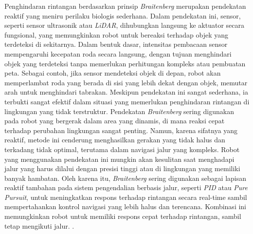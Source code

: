 Penghindaran rintangan berdasarkan prinsip \emph{Braitenberg} merupakan pendekatan reaktif yang meniru perilaku biologis sederhana. Dalam pendekatan ini, sensor, seperti sensor ultrasonik atau \emph{LiDAR}, dihubungkan langsung ke aktuator secara fungsional, yang memungkinkan robot untuk bereaksi terhadap objek yang terdeteksi di sekitarnya. Dalam bentuk dasar, intensitas pembacaan sensor mempengaruhi kecepatan roda secara langsung, dengan tujuan menghindari objek yang terdeteksi tanpa memerlukan perhitungan kompleks atau pembuatan peta. Sebagai contoh, jika sensor mendeteksi objek di depan, robot akan memperlambat roda yang berada di sisi yang lebih dekat dengan objek, memutar arah untuk menghindari tabrakan. Meskipun pendekatan ini sangat sederhana, ia terbukti sangat efektif dalam situasi yang memerlukan penghindaran rintangan di lingkungan yang tidak terstruktur. Pendekatan \emph{Braitenberg} sering digunakan pada robot yang bergerak dalam area yang dinamis, di mana reaksi cepat terhadap perubahan lingkungan sangat penting. Namun, karena sifatnya yang reaktif, metode ini cenderung menghasilkan gerakan yang tidak halus dan terkadang tidak optimal, terutama dalam navigasi jalur yang kompleks. Robot yang menggunakan pendekatan ini mungkin akan kesulitan saat menghadapi jalur yang harus dilalui dengan presisi tinggi atau di lingkungan yang memiliki banyak hambatan. Oleh karena itu, \emph{Braitenberg} sering digunakan sebagai lapisan reaktif tambahan pada sistem pengendalian berbasis jalur, seperti \emph{PID} atau \emph{Pure Pursuit}, untuk meningkatkan respons terhadap rintangan secara real-time sambil mempertahankan kontrol navigasi yang lebih halus dan terencana. Kombinasi ini memungkinkan robot untuk memiliki respons cepat terhadap rintangan, sambil tetap mengikuti jalur. \cite{braitenberg1986vehicles}.



